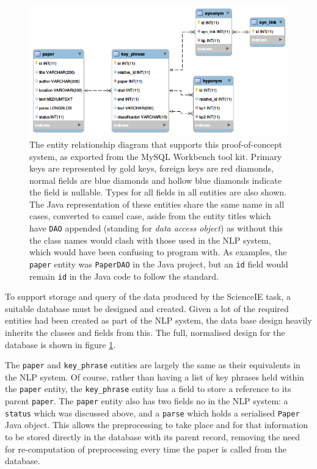\begin{figure}
	\centering
	\includegraphics[width=13cm]{img/fypdberd.png}
	\caption[Database Entity Relationship Diagram]{The entity relationship diagram that supports this proof-of-concept system, as exported from the MySQL Workbench tool kit. Primary keys are represented by gold keys, foreign keys are red diamonds, normal fields are blue diamonds and hollow blue diamonds indicate the field is nullable. Types for all fields in all entities are also shown. The Java representation of these entities share the same name in all cases, converted to camel case, aside from the entity titles which have \texttt{DAO} appended (standing for \textit{data access object}) as without this the class names would clash with those used in the NLP system, which would have been confusing to program with. As examples, the \texttt{paper} entity was \texttt{PaperDAO} in the Java project, but an \texttt{id} field would remain \texttt{id} in the Java code to follow the standard.}
	\label{figure:dberd}
\end{figure}

To support storage and query of the data produced by the ScienceIE task, a suitable database must be designed and created. Given a lot of the required entities had been created as part of the NLP system, the data base design heavily inherits the classes and fields from this. The full, normalised design for the database is shown in figure \ref{figure:dberd}.

The \texttt{paper} and \texttt{key\_phrase} entities are largely the same as their equivalents in the NLP system. Of course, rather than having a list of key phrases held within the \texttt{paper} entity, the \texttt{key\_phrase} entity has a field to store a reference to its parent \texttt{paper}. The \texttt{paper} entity also has two fields no in the NLP system: a \texttt{status} which was discussed above, and a \texttt{parse} which holds a serialised \texttt{Paper} Java object. This allows the preprocessing to take place and for that information to be stored directly in the database with its parent record, removing the need for re-computation of preprocessing every time the paper is called from the database.

